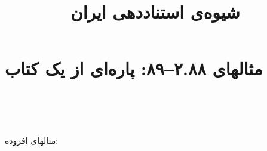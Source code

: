 \documentclass[a4paper,10pt]{article}
\begin{document}
\title{شیوه‌ی استناددهی ایران
 }
\author{}
\date{}
\maketitle



\section*{مثالهای ۲.۸۸--۸۹: پاره‌ای از یک کتاب}

\cite{میرکمالی1378}\\
\cite{phibbs1987}\\
\cite{افشارمهاجر1379}\\
\cite{wiens1983}


مثالهای افزوده:\\
\cite{اندرسن1989}\\
\cite{شریفی1380پاسخ}\\
\cite{naeim2001}\\
\cite{tychsen1990}\\






\end{document}
